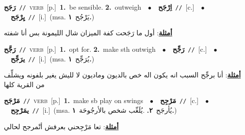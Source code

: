 \documentclass[10pt,a4paper,twoside]{article} %
\begin{document}
\begin{multicols}{2}
{\setlength\topsep{0pt}\textbf{\foreignlanguage{arabic}{رَجَح}}\ {\color{gray}\texttt{//}\color{black}}\ \textsc{verb}\ [p.]\ \textbf{1.}~be sensible.  \textbf{2.}~outweigh\ \ $\bullet$\ \ \setlength\topsep{0pt}\textbf{\foreignlanguage{arabic}{اِرْجَح}}\ {\color{gray}\texttt{//}\color{black}}\ [c.]\ \ $\bullet$\ \ \setlength\topsep{0pt}\textbf{\foreignlanguage{arabic}{يِرْجَح}}\ {\color{gray}\texttt{//}\color{black}}\ [i.]\ \color{gray}(msa. \foreignlanguage{arabic}{يَرْجُح}~\foreignlanguage{arabic}{\textbf{١.}})\color{black}\  \begin{flushright}\color{gray}\foreignlanguage{arabic}{\textbf{\underline{\foreignlanguage{arabic}{أمثلة}}}: أول ما رَجَحت كفة الميزان شال الليمونة بس أنا شفته}\end{flushright}\color{black}} \vspace{2mm}

{\setlength\topsep{0pt}\textbf{\foreignlanguage{arabic}{رَجَّح}}\ {\color{gray}\texttt{//}\color{black}}\ \textsc{verb}\ [p.]\ \textbf{1.}~opt for.  \textbf{2.}~make sth outwigh\ \ $\bullet$\ \ \setlength\topsep{0pt}\textbf{\foreignlanguage{arabic}{رَجِّح}}\ {\color{gray}\texttt{//}\color{black}}\ [c.]\ \ $\bullet$\ \ \setlength\topsep{0pt}\textbf{\foreignlanguage{arabic}{يرَجِّح}}\ {\color{gray}\texttt{//}\color{black}}\ [i.]\ \color{gray}(msa. \foreignlanguage{arabic}{يُرَجِّح}~\foreignlanguage{arabic}{\textbf{١.}})\color{black}\  \begin{flushright}\color{gray}\foreignlanguage{arabic}{\textbf{\underline{\foreignlanguage{arabic}{أمثلة}}}: أنا برجِّح السبب انه يكون اله خص بالديون وماديون لا لليش يغير بلفونه ويشلِّف من القرية كلها}\end{flushright}\color{black}} \vspace{2mm}

{\setlength\topsep{0pt}\textbf{\foreignlanguage{arabic}{مَرْجَح}}\ {\color{gray}\texttt{//}\color{black}}\ \textsc{verb}\ [p.]\ \textbf{1.}~make sb play on swings\ \ $\bullet$\ \ \setlength\topsep{0pt}\textbf{\foreignlanguage{arabic}{مَرْجِح}}\ {\color{gray}\texttt{//}\color{black}}\ [c.]\ \ $\bullet$\ \ \setlength\topsep{0pt}\textbf{\foreignlanguage{arabic}{يمَرْجِح}}\ {\color{gray}\texttt{//}\color{black}}\ [i.]\ \color{gray}(msa. \foreignlanguage{arabic}{يُأرجَح}~\foreignlanguage{arabic}{\textbf{٢.}}  .\foreignlanguage{arabic}{يُلَعِّب شخص بالأرجُوحَة}~\foreignlanguage{arabic}{\textbf{١.}})\color{black}\  \begin{flushright}\color{gray}\foreignlanguage{arabic}{\textbf{\underline{\foreignlanguage{arabic}{أمثلة}}}: تعا مَرْجِحني بعرفش أتْمرجح لحالي}\end{flushright}\color{black}} \vspace{2mm}


\end{multicols}
\end{document}
